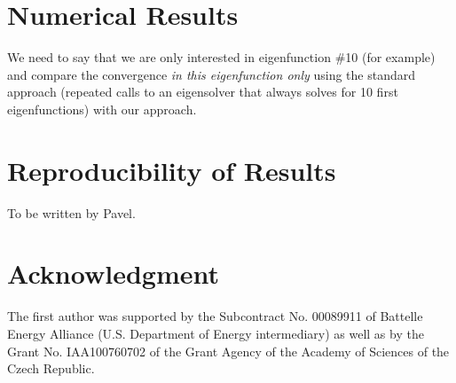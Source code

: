 \documentclass[preprint ,12pt]{elsarticle}
\begin{document}









\section{Numerical Results}

{\red We need to say that we are only interested in eigenfunction \#10 (for example)
and compare the convergence {\em in this eigenfunction only} 
using the standard approach (repeated calls to an 
eigensolver that always solves for 10 first eigenfunctions) with our approach.}

\section{Reproducibility of Results} \label{sec:reproducibility}

{\red To be written by Pavel.}

\section*{Acknowledgment}

The first author was supported by the Subcontract No. 00089911 of Battelle Energy
Alliance (U.S. Department of Energy intermediary) as well as by the Grant No. 
IAA100760702 of the Grant Agency of the Academy of Sciences of the Czech Republic.


\clearpage
\end{document}
